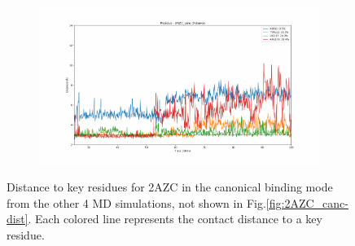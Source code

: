 \begin{figure}[!ht]
\begin{subfigure}{.45\textwidth}
  \end{subfigure}
    \begin{subfigure}{.45\textwidth}
     \centering
     \includegraphics[width=.95\linewidth]{chapter4/2AZC_canc/2AZC_canc-dist_4.pdf}
  \end{subfigure}
\caption{Distance to key residues for 2AZC in the canonical binding mode from the other 4 MD simulations, not shown in Fig.\ref{fig:2AZC_canc-dist}. Each colored line represents the contact distance to a key residue.}
\label{sup:2AZC_canc-dist}
\end{figure}  


